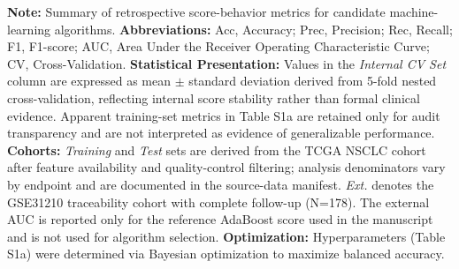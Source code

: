 \documentclass[a4paper,12pt]{article}
\begin{document}
\begin{landscape}
{    \vspace{1em}
    \noindent\footnotesize\textbf{Note:} Summary of retrospective score-behavior metrics for candidate machine-learning algorithms.
    \textbf{Abbreviations:} Acc, Accuracy; Prec, Precision; Rec, Recall; F1, F1-score; AUC, Area Under the Receiver Operating Characteristic Curve; CV, Cross-Validation.
    \textbf{Statistical Presentation:} Values in the \textit{Internal CV Set} column are expressed as mean $\pm$ standard deviation derived from 5-fold nested cross-validation, reflecting internal score stability rather than formal clinical evidence. Apparent training-set metrics in Table S1a are retained only for audit transparency and are not interpreted as evidence of generalizable performance.
    \textbf{Cohorts:} \textit{Training} and \textit{Test} sets are derived from the TCGA NSCLC cohort after feature availability and quality-control filtering; analysis denominators vary by endpoint and are documented in the source-data manifest. \textit{Ext.} denotes the GSE31210 traceability cohort with complete follow-up (N=178). The external AUC is reported only for the reference AdaBoost score used in the manuscript and is not used for algorithm selection.
    \textbf{Optimization:} Hyperparameters (Table S1a) were determined via Bayesian optimization to maximize balanced accuracy.
  }
  \restoregeometry
\end{landscape}

\clearpage
\end{document}

